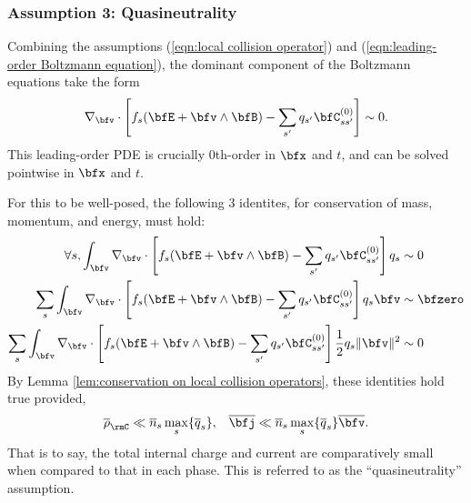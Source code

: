 \subsubsection*{Assumption 3: Quasineutrality}
    Combining the assumptions (\ref{eqn:local collision operator}) and (\ref{eqn:leading-order Boltzmann equation}), the dominant component of the Boltzmann equations take the form
    \begin{equation}\label{eqn:local leading-order Boltzmann equation}
        \nabla_{\bfv}\cdot\left[f_{s}(\bfE + \bfv\wedge\bfB) - \sum_{s'}q_{s'}\bfC_{ss'}^{(0)}\right]  \sim  0.
    \end{equation}
    This leading-order PDE is crucially 0th-order in $\bfx$ and $t$, and can be solved pointwise in $\bfx$ and $t$.
    
    For this to be well-posed, the following 3 identites, for conservation of mass, momentum, and energy, must hold:
    \begin{align}
        \forall s,  \int_{\bfv}\nabla_{\bfv}\cdot\left[f_{s}(\bfE + \bfv\wedge\bfB) - \sum_{s'}q_{s'}\bfC_{ss'}^{(0)}\right]q_{s}  &\sim  0  \\
        \sum_{s}\int_{\bfv}\nabla_{\bfv}\cdot\left[f_{s}(\bfE + \bfv\wedge\bfB) - \sum_{s'}q_{s'}\bfC_{ss'}^{(0)}\right]q_{s}\bfv  &\sim  \bfzero  \\
        \sum_{s}\int_{\bfv}\nabla_{\bfv}\cdot\left[f_{s}(\bfE + \bfv\wedge\bfB) - \sum_{s'}q_{s'}\bfC_{ss'}^{(0)}\right]\frac{1}{2}q_{s}\|\bfv\|^{2}  &\sim  0
    \end{align}
    By Lemma \ref{lem:conservation on local collision operators}, these identities hold true provided,
    \begin{align}
        \overline{\rho}_{\rmC}  \ll \overline{n}_{s}\max_{s}\{\overline{q}_{s}\},  &&
        \overline{\bfj}  \ll  \overline{n}_{s}\max_{s}\{\overline{q}_{s}\}\overline{\bfv}.
    \end{align}
    That is to say, the total internal charge and current are comparatively small when compared to that in each phase. This is referred to as the ``quasineutrality'' assumption.
    